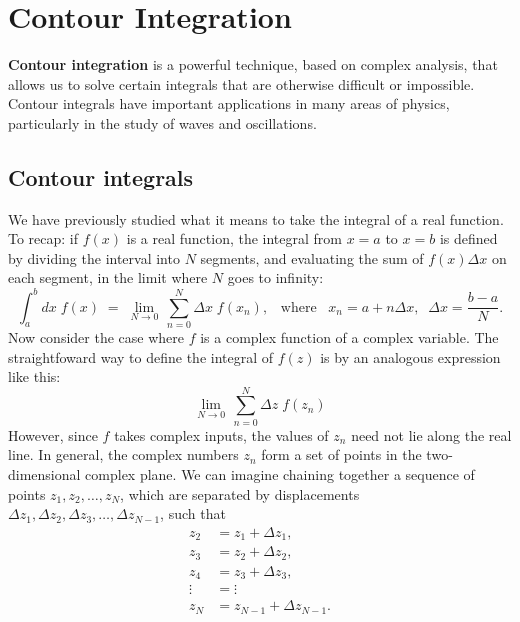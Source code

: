 \documentclass[10pt,a4paper]{article}
\begin{document}
\setcounter{page}{58}
\section{Contour Integration}\label{contour-integration}

\textbf{Contour integration} is a powerful technique, based on complex
analysis, that allows us to solve certain integrals that are otherwise
difficult or impossible. Contour integrals have important applications
in many areas of physics, particularly in the study of waves and
oscillations.

\hypertarget{contour-integrals}{%
\subsection{Contour integrals}\label{contour-integrals}}

We have previously studied what it means to take the integral of a
real function. To recap: if $f(x)$ is a real function, the integral
from $x=a$ to $x=b$ is defined by dividing the interval into $N$
segments, and evaluating the sum of $f(x)\Delta x$ on each segment, in
the limit where $N$ goes to infinity:
\begin{equation}
\int_a^b dx\; f(x) \;=\; \lim_{N \rightarrow 0} \, \sum_{n=0}^{N} \Delta x\; f(x_n), \;\;\;\mathrm{where}\;\;\;x_n = a + n\Delta x, \;\;\Delta x = \frac{b-a}{N}.
\end{equation}
Now consider the case where $f$ is a complex function of a complex
variable. The straightfoward way to define the integral of $f(z)$ is
by an analogous expression like this:
\begin{equation}
\lim_{N \rightarrow 0} \, \sum_{n=0}^{N} \Delta z\; f(z_n)
\end{equation}
However, since $f$ takes complex inputs, the values of $z_n$ need not
lie along the real line. In general, the complex numbers $z_n$ form a
set of points in the two-dimensional complex plane. We can imagine
chaining together a sequence of points $z_1, z_2, \dots, z_N$, which
are separated by displacements $\Delta z_1, \Delta z_2, \Delta z_3,
\dots, \Delta z_{N-1}$, such that
\begin{equation}
\begin{aligned}z_2 &= z_1 + \Delta z_1, \\ z_3 &= z_2 + \Delta z_2, \\ z_4 &= z_3 + \Delta z_3, \\ \vdots &= \vdots\\ z_N &= z_{N-1} + \Delta z_{N-1}.\end{aligned}
\end{equation}
\end{document}
